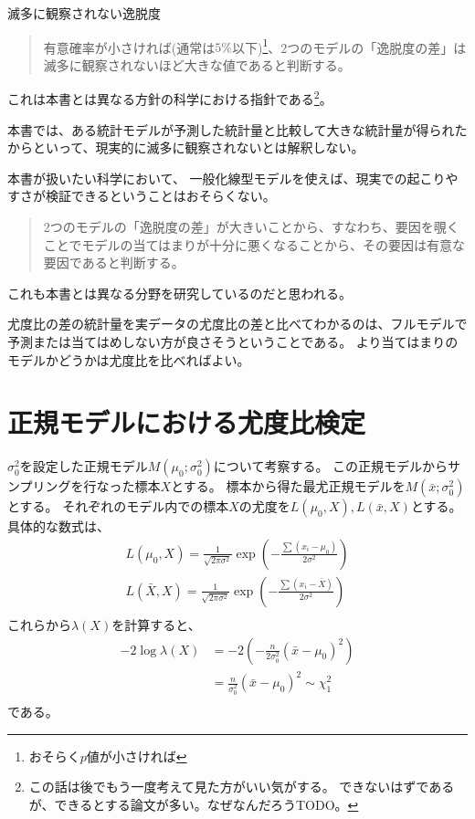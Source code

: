 \begin{SMbox}{滅多に観察されない逸脱度}
\begin{quote}
    有意確率が小さければ(通常は$5\%$以下)\footnote{おそらく$p$値が小さければ}、2つのモデルの「逸脱度の差」は滅多に観察されないほど大きな値であると判断する。
\end{quote}
    これは本書とは異なる方針の科学における指針である\footnote{
        この話は後でもう一度考えて見た方がいい気がする。
        できないはずであるが、できるとする論文が多い。なぜなんだろうTODO。
    }。

    本書では、ある統計モデルが予測した統計量と比較して大きな統計量が得られたからといって、現実的に滅多に観察されないとは解釈しない。

    本書が扱いたい科学において、
    一般化線型モデルを使えば、現実での起こりやすさが検証できるということはおそらくない。
\begin{quote}
    2つのモデルの「逸脱度の差」が大きいことから、すなわち、要因を覗くことでモデルの当てはまりが十分に悪くなることから、その要因は有意な要因であると判断する。
\end{quote}
    これも本書とは異なる分野を研究しているのだと思われる。

    尤度比の差の統計量を実データの尤度比の差と比べてわかるのは、フルモデルで予測または当てはめしない方が良さそうということである。
    より当てはまりのモデルかどうかは尤度比を比べればよい。
\end{SMbox}

\section{正規モデルにおける尤度比検定}

$\sigma^2_0$を設定した正規モデル$M(\mu_0;\sigma^2_0)$について考察する。
この正規モデルからサンプリングを行なった標本$X$とする。
標本から得た最尤正規モデルを$M(\bar{x};\sigma^2_0)$とする。
それぞれのモデル内での標本$X$の尤度を$L(\mu_0,X),L(\bar{x},X)$とする。
具体的な数式は、
\begin{align}
    L(\mu_0,X)=\frac{1}{\sqrt{2\pi\sigma^2}}\exp(-\frac{\sum(x_i-\mu_0)}{2\sigma^2})\\
    L(\bar{X},X)=\frac{1}{\sqrt{2\pi\sigma^2}}\exp(-\frac{\sum(x_i-\bar{X})}{2\sigma^2})\\
\end{align}
これらから$\lambda(X)$を計算すると、
\begin{align}
    -2\log\lambda(X) &= -2(-\frac{n}{2\sigma^2_0}(\bar{x}-\mu_0)^2) \\
    &= \frac{n}{\sigma^2_0}(\bar{x}-\mu_0)^2 \sim \chi^2_1 \\
\end{align}
である。

